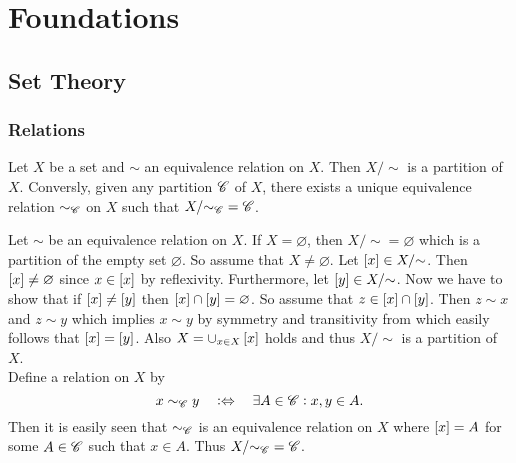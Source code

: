 \chapter{Foundations}
\section{Set Theory}
\subsection{Relations}
\begin{exercise}
Let $X$ be a set and $\sim$ an equivalence relation on $X$. Then $X/{\sim}$ is a partition of $X$. Conversly, given any partition $\mathscr{C}$ of $X$, there exists a unique equivalence relation ${\sim}_{\mathscr{C}}$ on $X$ such that $X/ {\sim}_{\mathscr{C}} = \mathscr{C}$.
\label{ex:1.1}
\end{exercise}

\begin{solution}
Let $\sim$ be an equivalence relation on $X$. If $X = \varnothing$, then $X/{\sim} = \varnothing$ which is a partition of the empty set $\varnothing$. So assume that $X \neq \varnothing$. Let $\eqclass{x} \in X/{\sim}$. Then $\eqclass{x} \neq \varnothing$ since $x \in \eqclass{x}$ by reflexivity. Furthermore, let $\eqclass{y} \in X/{\sim}$. Now we have to show that if $\eqclass{x} \neq \eqclass{y}$ then $\eqclass{x} \cap \eqclass{y} = \varnothing$. So assume that $z \in \eqclass{x} \cap \eqclass{y}$. Then $z \sim x$ and $z \sim y$ which implies $x \sim y$ by symmetry and transitivity from which easily follows that $\eqclass{x} = \eqclass{y}$. Also $X = \cup_{x \in X} \eqclass{x}$ holds and thus $X/{\sim}$ is a partition of $X$.\\
Define a relation on $X$ by
\begin{equation*}
x \sim_{\mathscr{C}} y \quad : \Leftrightarrow \quad \exists A \in \mathscr{C} : x,y \in A.
\end{equation*}
Then it is easily seen that $\sim_{\mathscr{C}}$ is an equivalence relation on $X$ where $\eqclass{x} = A$ for some $A \in \mathscr{C}$ such that $x \in A$. Thus $X/ {\sim}_{\mathscr{C}} = \mathscr{C}$.
\end{solution}